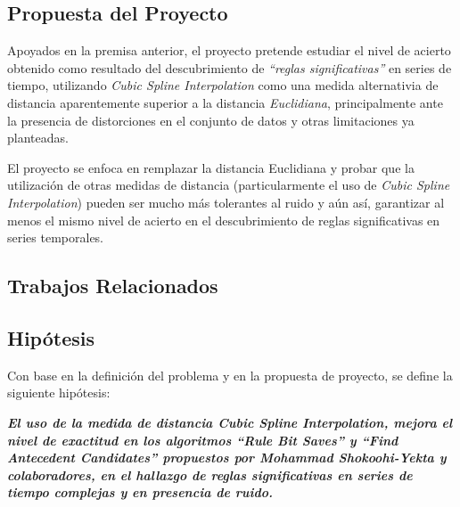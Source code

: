 \subsection{Propuesta del Proyecto}
Apoyados en la premisa anterior, el proyecto pretende estudiar el nivel de acierto obtenido como resultado del descubrimiento de \textit{\enquote{reglas significativas}} en series de tiempo, utilizando \textit{Cubic Spline Interpolation} como una medida alternativia de distancia aparentemente superior a la distancia \textit{Euclidiana}, principalmente ante la presen\-cia de distorciones en el conjunto de datos y otras limitaciones ya planteadas.\par
El proyecto se enfoca en remplazar la distancia Euclidiana y probar que la utilizaci\'on de otras medidas de distancia (particularmente el uso de \textit{Cubic Spline Interpolation}) pueden ser mucho m\'as tolerantes al ruido y a\'un as\'i, garantizar al menos el mismo nivel de acierto en el descubrimiento de reglas significativas en series temporales.
\subsection{Trabajos Relacionados}

\subsection{Hip\'otesis}
Con base en la definici\'on del problema y en la propuesta de proyecto, se define la siguiente hip\'otesis:\par
\textbf{\textit{El uso de la medida de distancia \textit{Cubic Spline Interpolation}, mejora el nivel de exactitud en los algoritmos \textit{\textbf{\enquote{Rule Bit Saves}}} y \textit{\textbf{\enquote{Find Antecedent Candidates}}} propuestos por Mohammad Shokoohi-Yekta y colaboradores, en el hallazgo de reglas significativas en series de tiempo complejas y en presencia de ruido.}} 
